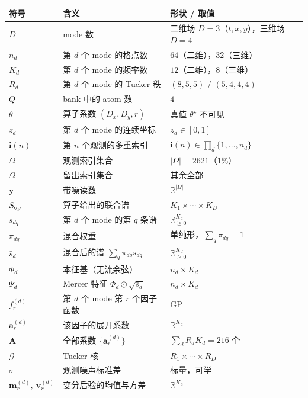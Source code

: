 \documentclass[11pt,a4paper]{article}
\begin{document}
\begin{table}[h]
\centering
\small
\begin{tabular}{lll}
\toprule
符号 & 含义 & 形状 / 取值 \\
\midrule
$D$ & mode 数 & 二维场 $D=3$（$t,x,y$），三维场 $D=4$ \\
$n_d$ & 第 $d$ 个 mode 的格点数 & $64$（二维），$32$（三维） \\
$K_d$ & 第 $d$ 个 mode 的频率数 & $12$（二维），$8$（三维） \\
$R_d$ & 第 $d$ 个 mode 的 Tucker 秩 & $(8,5,5)$ / $(5,4,4,4)$ \\
$Q$ & bank 中的 atom 数 & $4$ \\
$\theta$ & 算子系数 $(D_x, D_y, r)$ & 真值 $\theta^\star$ 不可见 \\
\midrule
$z_d$ & 第 $d$ 个 mode 的连续坐标 & $z_d \in [0,1]$ \\
$\mathbf{i}(n)$ & 第 $n$ 个观测的多重索引 & $\mathbf{i}(n) \in \prod_d \{1,\dots,n_d\}$ \\
$\Omega$ & 观测索引集合 & $\lvert\Omega\rvert = 2621$（$1\%$） \\
$\bar{\Omega}$ & 留出索引集合 & 其余全部 \\
$\mathbf{y}$ & 带噪读数 & $\mathbb{R}^{\lvert\Omega\rvert}$ \\
\midrule
$S_{\mathrm{op}}$ & 算子给出的联合谱 & $K_1 \times \cdots \times K_D$ \\
$s_{dq}$ & 第 $d$ 个 mode 的第 $q$ 条谱 & $\mathbb{R}_{\ge 0}^{K_d}$ \\
$\pi_{dq}$ & 混合权重 & 单纯形，$\sum_q \pi_{dq}=1$ \\
$\bar{s}_d$ & 混合后的谱 $\sum_q \pi_{dq}s_{dq}$ & $\mathbb{R}_{\ge 0}^{K_d}$ \\
$\Phi_d$ & 本征基（无流余弦） & $n_d \times K_d$ \\
$\Psi_d$ & Mercer 特征 $\Phi_d \odot \sqrt{\bar{s}_d}$ & $n_d \times K_d$ \\
\midrule
$f^{(d)}_r$ & 第 $d$ 个 mode 第 $r$ 个因子函数 & GP \\
$\mathbf{a}^{(d)}_r$ & 该因子的展开系数 & $\mathbb{R}^{K_d}$ \\
$\mathbf{A}$ & 全部系数 $\{\mathbf{a}^{(d)}_r\}$ & $\sum_d R_d K_d = 216$ 个 \\
$\mathcal{G}$ & Tucker 核 & $R_1 \times \cdots \times R_D$ \\
$\sigma$ & 观测噪声标准差 & 标量，可学 \\
\midrule
$\mathbf{m}^{(d)}_r,\ \mathbf{v}^{(d)}_r$ & 变分后验的均值与方差 & $\mathbb{R}^{K_d}$ \\
\bottomrule
\end{tabular}
\end{table}
\end{document}
